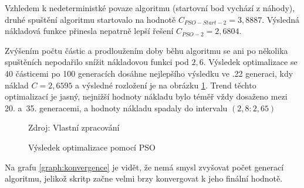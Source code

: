 \documentclass[a4paper, twoside, 12pt, czech]{article}
\begin{document}
Vzhledem k nedeterministké povaze algoritmu (startovní bod vychází z náho\-dy), druhé 
spuštění algoritmu startovalo na hodnotě $C_{PSO-Start-2}=3,8887$. Výsledná nákladová
funkce přinesla nepatrně lepší řešení $C_{PSO-2}=2,6804$.

Zvýšením počtu částic a prodloužením doby běhu algoritmu se ani po několi\-ka spuštěních 
nepodařilo snížit nákladovou funkci pod $2,6$. Výsledek optimalizace se 
40 částicemi po 100 generacích dosáhne nejlepšího výsledku ve .22 generaci, kdy 
náklad $C=2,6595$ a výsledné rozložení je na obrázku \ref{pic:pso}. Trend těchto optimalizací je jasný, nejnižší hodnoty nákladu bylo 
téměř vždy dosaženo mezi 20. a~35. generacemi, a hodnoty nákladu 
spadaly do intervalu $(2,8 : 2,65)$

\begin{figure}[h]
    
    \centering
    \caption{Výsledek optimalizace pomocí PSO}
    \vspace{0.5cm}
    \begin{keyboardlayout}
                     
        \newrow
        
                     
        \newrow
        
                    
        \newrow
        
                   
        \newrow
        
               
    \end{keyboardlayout}
    
    \small{Zdroj: Vlastní zpracování}
    \label{pic:pso}
\end{figure}


Na grafu \ref{graph:konvergence} je vidět, že nemá smysl zvyšovat počet generací algoritmu, jelikož 
skritp začne velmi brzy konvergovat k jeho finální hodnotě.
\end{document}
